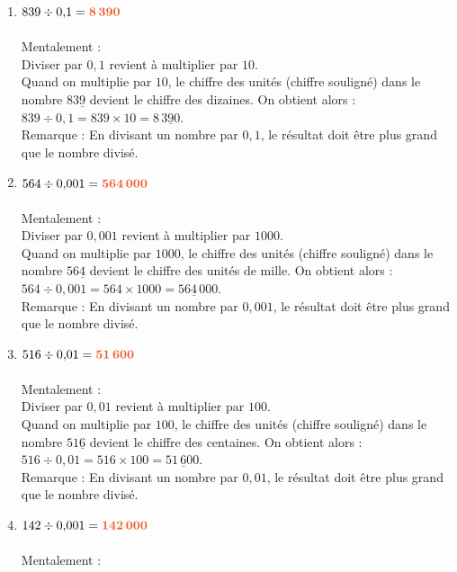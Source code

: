 \documentclass[10pt,a4paper]{article}
\begin{document}
\begin{enumerate}[itemsep=1em]
	\item $839\div 0{,}1={\color[HTML]{f15929}\boldsymbol{8\,390}}$\\{\color[HTML]{216D9A}\\ Mentalement : \\
  Diviser par $0,1$ revient à multiplier par $10$. \\
  Quand on multiplie par $10$, le chiffre des unités (chiffre souligné) dans le nombre  $83\underline{9}$
  devient le chiffre des dizaines. On obtient alors :\\
  $839\div 0{,}1=839\times 10=8\,3\underline{9}0$.\\
  Remarque : En divisant un nombre par $0,1$, le résultat doit être plus grand que le nombre divisé.
     }
	\item $564\div 0{,}001={\color[HTML]{f15929}\boldsymbol{564\,000}}$\\{\color[HTML]{216D9A}\\ Mentalement : \\
  Diviser par $0,001$ revient à multiplier par $1000$. \\
  Quand on multiplie par $1000$, le chiffre des unités (chiffre souligné) dans le nombre  $56\underline{4}$
  devient le chiffre des unités de mille. On obtient alors :\\
  $564\div 0{,}001=564\times 1000=56\underline{4}\,000$.\\
  Remarque : En divisant un nombre par $0,001$, le résultat doit être plus grand que le nombre divisé.
     }
	\item $516\div 0{,}01={\color[HTML]{f15929}\boldsymbol{51\,600}}$\\{\color[HTML]{216D9A}\\ Mentalement : \\
  Diviser par $0,01$ revient à multiplier par $100$. \\
  Quand on multiplie par $100$, le chiffre des unités (chiffre souligné) dans le nombre  $51\underline{6}$
  devient le chiffre des centaines. On obtient alors :\\
  $516\div 0{,}01=516\times 100=51\,\underline{6}00$.\\
  Remarque : En divisant un nombre par $0,01$, le résultat doit être plus grand que le nombre divisé.
     }
	\item $142\div 0{,}001={\color[HTML]{f15929}\boldsymbol{142\,000}}$\\{\color[HTML]{216D9A}\\ Mentalement : \\
}
\end{enumerate}
\end{document}
